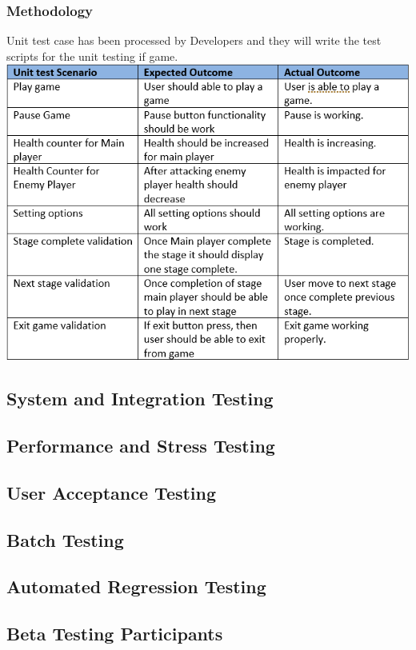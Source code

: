 \documentclass{article}
\begin{document}
\subsubsection{Methodology}
Unit test case has been processed by Developers and they will write the test scripts for the unit testing if game.
\centering
\includegraphics[scale=0.9]{./images/unittesting.PNG}


\subsection{System and Integration Testing}
\subsection{Performance and Stress Testing}
\subsection{User Acceptance Testing }
\subsection{Batch Testing}
\subsection{Automated Regression Testing }
\subsection{Beta Testing Participants}

\newpage
\end{document}
